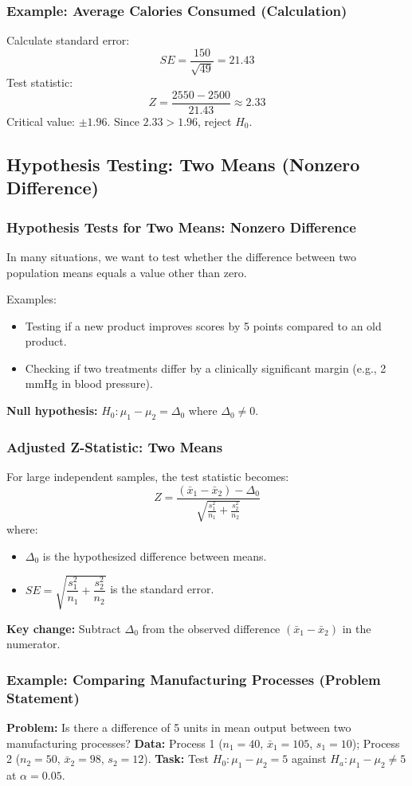 \documentclass[handout]{beamer}
\begin{document}
\begin{frame}
\frametitle{Example: Average Calories Consumed (Calculation)}
Calculate standard error:
\[
SE = \frac{150}{\sqrt{49}} = 21.43
\]
Test statistic:
\[
Z = \frac{2550-2500}{21.43} \approx 2.33
\]
Critical value: $\pm1.96$. \newline
Since $2.33 > 1.96$, reject $H_0$.
\end{frame}

\subsection{Hypothesis Testing: Two Means (Nonzero Difference)}

\begin{frame}
\frametitle{Hypothesis Tests for Two Means: Nonzero Difference}
In many situations, we want to test whether the difference between two population means equals a value other than zero.

Examples:
\begin{itemize}
\item Testing if a new product improves scores by 5 points compared to an old product.
\item Checking if two treatments differ by a clinically significant margin (e.g., 2 mmHg in blood pressure).
\end{itemize}
\textbf{Null hypothesis:} $H_0: \mu_1 - \mu_2 = \Delta_0$ where $\Delta_0 \neq 0$.
\end{frame}

\begin{frame}
\frametitle{Adjusted Z-Statistic: Two Means}
For large independent samples, the test statistic becomes:
\[
Z = \frac{(\bar{x}_1 - \bar{x}_2) - \Delta_0}{\sqrt{\frac{s_1^2}{n_1} + \frac{s_2^2}{n_2}}}
\]
where:
\begin{itemize}
\item $\Delta_0$ is the hypothesized difference between means.
\item $SE = \sqrt{\dfrac{s_1^2}{n_1} + \dfrac{s_2^2}{n_2}}$ is the standard error.
\end{itemize}
\textbf{Key change:} Subtract $\Delta_0$ from the observed difference $(\bar{x}_1 - \bar{x}_2)$ in the numerator.
\end{frame}

\begin{frame}
\frametitle{Example: Comparing Manufacturing Processes (Problem Statement)}
\textbf{Problem:} Is there a difference of 5 units in mean output between two manufacturing processes? \newline
\textbf{Data:} Process 1 ($n_1=40$, $\bar{x}_1=105$, $s_1=10$); Process 2 ($n_2=50$, $\bar{x}_2=98$, $s_2=12$). \newline
\textbf{Task:} Test $H_0: \mu_1 - \mu_2 = 5$ against $H_a: \mu_1 - \mu_2 \neq 5$ at $\alpha=0.05$.
\end{frame}
\end{document}
